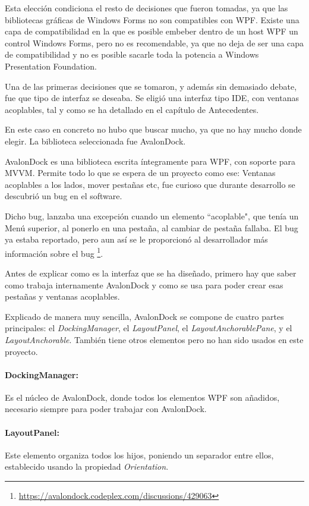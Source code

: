 Esta elecci\'on condiciona el resto de decisiones que fueron tomadas, ya que las bibliotecas gr\'aficas
de Windows Forms no son compatibles con WPF. Existe una capa de compatibilidad en la que es posible embeber dentro
de un host WPF un control Windows Forms, pero no es recomendable, ya que no deja de ser una capa de compatibilidad y
no es posible sacarle toda la potencia a Windows Presentation Foundation.

Una de las primeras decisiones que se tomaron, y adem\'as sin demasiado debate, fue que tipo de interfaz se deseaba.
Se eligi\'o una interfaz tipo IDE, con ventanas acoplables, tal y como se ha detallado en el cap\'itulo de Antecedentes.

En este caso en concreto no hubo que buscar mucho, ya que no hay mucho donde elegir. La biblioteca seleccionada
fue AvalonDock.

AvalonDock es una biblioteca escrita \'integramente para WPF, con soporte para MVVM. Permite todo lo que se espera
de un proyecto como ese: Ventanas acoplables a los lados, mover pesta\~nas etc, fue curioso que durante desarrollo se descubri\'o
un bug en el software.

Dicho bug, lanzaba una excepci\'on cuando un elemento ``acoplable", que ten\'ia un Men\'u superior, al ponerlo
en una pesta\~na, al cambiar de pesta\~na fallaba. El bug ya estaba reportado, pero aun as\'i se le proporcion\'o
al desarrollador m\'as informaci\'on sobre el bug \footnote{\url{https://avalondock.codeplex.com/discussions/429063}}.

Antes de explicar como es la interfaz que se ha dise\~nado, primero hay que saber como trabaja internamente
AvalonDock y como se usa para poder crear esas pesta\~nas y ventanas acoplables.

Explicado de manera muy sencilla, AvalonDock se compone de cuatro partes principales: el \emph{DockingManager},
el \emph{LayoutPanel}, el \emph{LayoutAnchorablePane}, y el \emph{LayoutAnchorable}.
Tambi\'en tiene otros elementos pero no han sido usados en este proyecto.

\paragraph{DockingManager:} Es el n\'ucleo de AvalonDock, donde todos los elementos WPF son a\~nadidos, necesario
siempre para poder trabajar con AvalonDock.

\paragraph{LayoutPanel:} Este elemento organiza todos los hijos, poniendo un separador entre ellos, establecido
usando la propiedad \emph{Orientation}.

